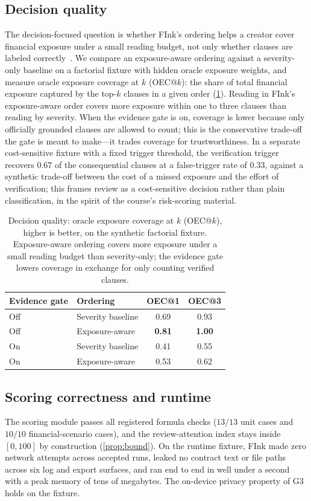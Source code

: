\documentclass{article}
\theoremstyle{plain}
\begin{document}
\subsection{Decision quality}
The decision-focused question is whether FInk's ordering helps a creator cover
financial exposure under a small reading budget, not only whether clauses are
labeled correctly~\citep{elmachtoub2022spo}. We compare an exposure-aware ordering
against a severity-only baseline on a factorial fixture with hidden oracle
exposure weights, and measure oracle exposure coverage at $k$ (OEC@$k$): the share
of total financial exposure captured by the top-$k$ clauses in a given order
(\cref{tab:decision}). Reading in FInk's exposure-aware order covers more exposure
within one to three clauses than reading by severity. When the evidence gate is
on, coverage is lower because only officially grounded clauses are allowed to
count; this is the conservative trade-off the gate is meant to make---it trades
coverage for trustworthiness. In a separate cost-sensitive fixture with a fixed
trigger threshold, the verification trigger recovers $0.67$ of the consequential
clauses at a false-trigger rate of $0.33$, against a synthetic trade-off between
the cost of a missed exposure and the effort of verification; this frames review
as a cost-sensitive decision rather than plain classification, in the spirit of
the course's risk-scoring material.

\begin{table}[t]
  \centering
  \caption{Decision quality: oracle exposure coverage at $k$ (OEC@$k$), higher is
  better, on the synthetic factorial fixture. Exposure-aware ordering covers more
  exposure under a small reading budget than severity-only; the evidence gate
  lowers coverage in exchange for only counting verified clauses.}
  \label{tab:decision}
  \begin{tabular}{llcc}
    \toprule
    Evidence gate & Ordering        & OEC@1 & OEC@3 \\
    \midrule
    Off & Severity baseline & 0.69 & 0.93 \\
    Off & Exposure-aware    & \textbf{0.81} & \textbf{1.00} \\
    On  & Severity baseline & 0.41 & 0.55 \\
    On  & Exposure-aware    & 0.53 & 0.62 \\
    \bottomrule
  \end{tabular}
\end{table}

\subsection{Scoring correctness and runtime}
The scoring module passes all registered formula checks ($13/13$ unit cases and
$10/10$ financial-scenario cases), and the review-attention index stays inside
$[0,100]$ by construction (\cref{prop:bound}). On the runtime fixture, FInk made
zero network attempts across accepted runs, leaked no contract text or file paths
across six log and export surfaces, and ran end to end in well under a second with
a peak memory of tens of megabytes. The on-device privacy property of G3 holds on
the fixture.
\end{document}
